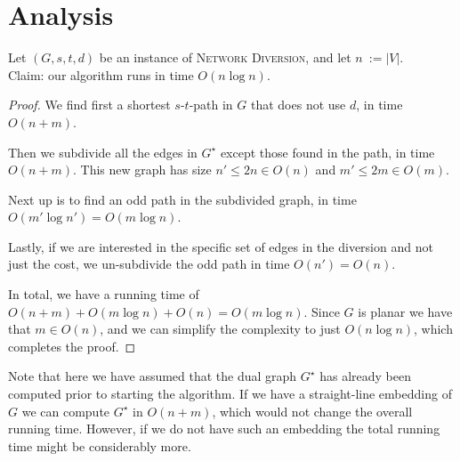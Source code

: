 \section{Analysis}


\begin{theorem}
    Let $(G, s, t, d)$ be an instance of \textsc{Network Diversion}, and let $n~:= |V|$. \\
    Claim: our algorithm runs in time $O(n \log n)$.
    
    \begin{proof}
        We find first a shortest $s$-$t$-path in $G$ that does not use $d$, in time $O(n+m)$.
    
        Then we subdivide all the edges in $G^\star$ except those found in the path, in time $O(n+m)$. This new graph has size $n' \leq 2n \in O(n)$ and $m' \leq 2m \in O(m)$.
    
        Next up is to find an odd path in the subdivided graph, in time $O(m' \log n') = O(m \log n)$.
    
        Lastly, if we are interested in the specific set of edges in the diversion and not just the cost, we un-subdivide the odd path in time $O(n') = O(n)$.
    
        In total, we have a running time of $O(n+m) + O(m \log n) + O(n) = O(m \log n)$. Since $G$ is planar we have that $m \in O(n)$, and we can simplify the complexity to just $O(n \log n)$, which completes the proof.
    \end{proof}
\end{theorem}

Note that here we have assumed that the dual graph $G^\star$ has already been computed prior to starting the algorithm. If we have a straight-line embedding of $G$ we can compute $G^\star$ in $O(n+m)$, which would not change the overall running time. However, if we do not have such an embedding the total running time might be considerably more.

